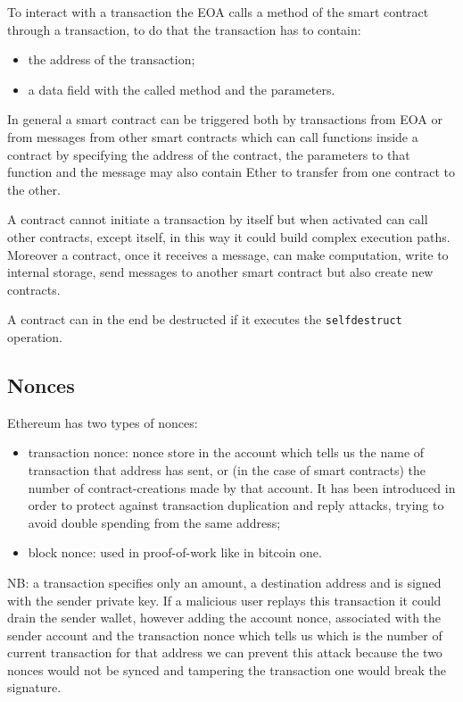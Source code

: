 To interact with a transaction the EOA calls a method of the smart contract through a transaction, to do that the transaction has to contain:
\begin{itemize}
    \item the address of the transaction;
    \item a data field with the called method and the parameters.
\end{itemize}
In general a smart contract can be triggered both by transactions from EOA or from messages from other smart contracts which can call functions inside a contract by specifying the address of the contract, the parameters to that function and the message may also contain Ether to transfer from one contract to the other.

A contract cannot initiate a transaction by itself but when activated can call other contracts, except itself, in this way it could build complex execution paths.
Moreover a contract, once it receives a message, can make computation, write to internal storage, send messages to another smart contract but also create new contracts.

A contract can in the end be destructed if it executes the \verb|selfdestruct| operation.

\subsection{Nonces}
Ethereum has two types of nonces:
\begin{itemize}
    \item transaction nonce: nonce store in the account which tells us the name of transaction that address has sent, or (in the case of smart contracts) the number of contract-creations made by that account.
    It has been introduced in order to protect against transaction duplication and reply attacks, trying to avoid double spending from the same address;
    \item block nonce: used in proof-of-work like in bitcoin one.
\end{itemize}
NB: a transaction specifies only an amount, a destination address and is signed with the sender private key.
If a malicious user replays this transaction it could drain the sender wallet, however adding the account nonce, associated with the sender account and the transaction nonce which tells us which is the number of current transaction for that address we can prevent this attack because the two nonces would not be synced and tampering the transaction one would break the signature.

